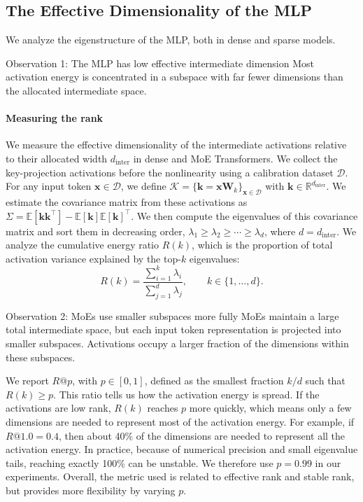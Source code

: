 \subsection{The Effective Dimensionality of the MLP}
\label{sec:zon-rank_observations}
We analyze the eigenstructure of the MLP, both in dense and sparse models.

\begin{insightbox}{Observation 1: The MLP has low effective intermediate dimension}
Most activation energy is concentrated in a subspace with far fewer dimensions than the allocated intermediate space.
\end{insightbox}

\paragraph{Measuring the rank} We measure the effective dimensionality of the intermediate activations relative to their allocated width
$d_{\text{inter}}$ in dense and MoE Transformers.
We collect the key-projection activations before the nonlinearity using a calibration dataset $\mathcal{D}$.
For any input token $\mathbf{x} \in \mathcal{D}$, we define
$\mathcal{K} = \{ \mathbf{k} = \mathbf{x}\textbf{W}_{k} \}_{\mathbf{x} \in \mathcal{D}}$ with $\mathbf{k} \in \mathbb{R}^{d_{\text{inter}} }$.
We estimate the covariance matrix from these activations as
$\Sigma = \mathbb{E}[\mathbf{k}\mathbf{k}^\top] - \mathbb{E}[\mathbf{k}]\mathbb{E}[\mathbf{k}]^\top$.
We then compute the eigenvalues of this covariance matrix and sort
them in decreasing order, $\lambda_1 \geq \lambda_2 \geq \cdots \geq
\lambda_d$, where $d=d_{\text{inter}}$. We analyze the cumulative energy ratio $R(k)$, which is the
proportion of total activation variance explained by the top-$k$ eigenvalues:
\[
    R(k) = \frac{\sum_{i=1}^{k} \lambda_i}{\sum_{j=1}^{d} \lambda_j},
    \qquad k \in \{1,\ldots,d\}.
\]

    \begin{insightbox}{Observation 2: MoEs use smaller subspaces more fully}
    MoEs maintain a large total intermediate space, but each input
    token representation is projected into smaller subspaces.
    Activations occupy a larger fraction of the dimensions within these subspaces.
    \end{insightbox}

We report $R@p$, with $p \in [0,1]$, defined as the smallest fraction
$k/d$ such that $R(k) \geq p$. This ratio tells us how the activation energy is
spread. If the activations are low rank, $R(k)$ reaches $p$
more quickly, which means only a few dimensions are needed to represent most of
the activation energy. For example, if $R@1.0 = 0.4$, then about 40\% of the
dimensions are needed to represent all the activation energy. In practice,
because of numerical precision and small eigenvalue tails, reaching exactly
100\% can be unstable. We therefore use $p=0.99$ in our experiments.
Overall, the metric used is related to effective rank and stable rank, but
provides more flexibility by varying $p$.

